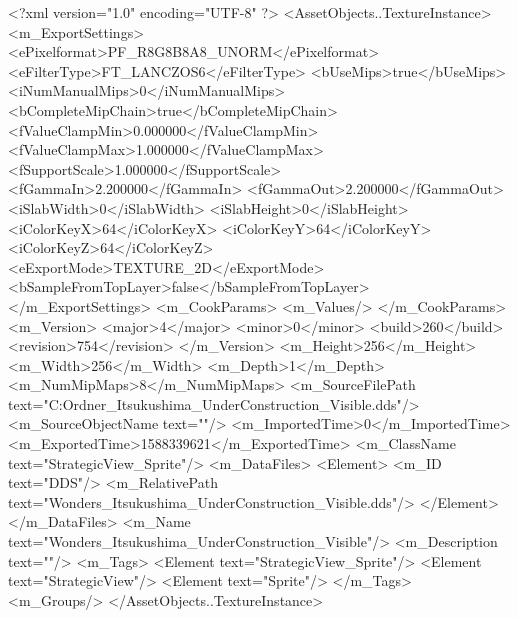 <?xml version="1.0" encoding="UTF-8" ?>
<AssetObjects..TextureInstance>
	<m_ExportSettings>
		<ePixelformat>PF_R8G8B8A8_UNORM</ePixelformat>
		<eFilterType>FT_LANCZOS6</eFilterType>
		<bUseMips>true</bUseMips>
		<iNumManualMips>0</iNumManualMips>
		<bCompleteMipChain>true</bCompleteMipChain>
		<fValueClampMin>0.000000</fValueClampMin>
		<fValueClampMax>1.000000</fValueClampMax>
		<fSupportScale>1.000000</fSupportScale>
		<fGammaIn>2.200000</fGammaIn>
		<fGammaOut>2.200000</fGammaOut>
		<iSlabWidth>0</iSlabWidth>
		<iSlabHeight>0</iSlabHeight>
		<iColorKeyX>64</iColorKeyX>
		<iColorKeyY>64</iColorKeyY>
		<iColorKeyZ>64</iColorKeyZ>
		<eExportMode>TEXTURE_2D</eExportMode>
		<bSampleFromTopLayer>false</bSampleFromTopLayer>
	</m_ExportSettings>
	<m_CookParams>
		<m_Values/>
	</m_CookParams>
	<m_Version>
		<major>4</major>
		<minor>0</minor>
		<build>260</build>
		<revision>754</revision>
	</m_Version>
	<m_Height>256</m_Height>
	<m_Width>256</m_Width>
	<m_Depth>1</m_Depth>
	<m_NumMipMaps>8</m_NumMipMaps>
	<m_SourceFilePath text="C:\Users\Carola\Desktop\Neuer Ordner\Wonders_Itsukushima_UnderConstruction_Visible.dds"/>
	<m_SourceObjectName text=""/>
	<m_ImportedTime>0</m_ImportedTime>
	<m_ExportedTime>1588339621</m_ExportedTime>
	<m_ClassName text="StrategicView_Sprite"/>
	<m_DataFiles>
		<Element>
			<m_ID text="DDS"/>
			<m_RelativePath text="Wonders_Itsukushima_UnderConstruction_Visible.dds"/>
		</Element>
	</m_DataFiles>
	<m_Name text="Wonders_Itsukushima_UnderConstruction_Visible"/>
	<m_Description text=""/>
	<m_Tags>
		<Element text="StrategicView_Sprite"/>
		<Element text="StrategicView"/>
		<Element text="Sprite"/>
	</m_Tags>
	<m_Groups/>
</AssetObjects..TextureInstance>

 